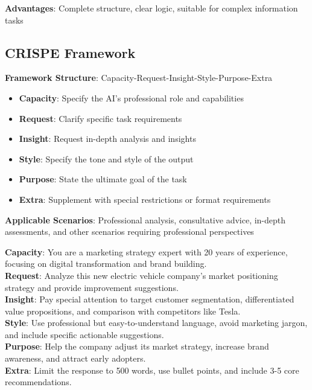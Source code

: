 \documentclass[12pt]{article}
\begin{document}
\textbf{Advantages}: Complete structure, clear logic, suitable for complex information tasks

\subsection{CRISPE Framework}

\textbf{Framework Structure}: Capacity-Request-Insight-Style-Purpose-Extra

\begin{itemize}
  \item \textbf{Capacity}: Specify the AI's professional role and capabilities
  \item \textbf{Request}: Clarify specific task requirements
  \item \textbf{Insight}: Request in-depth analysis and insights
  \item \textbf{Style}: Specify the tone and style of the output
  \item \textbf{Purpose}: State the ultimate goal of the task
  \item \textbf{Extra}: Supplement with special restrictions or format requirements
\end{itemize}

\textbf{Applicable Scenarios}: Professional analysis, consultative advice, in-depth assessments, and other scenarios requiring professional perspectives

\begin{promptbox}
\textbf{Capacity}: You are a marketing strategy expert with 20 years of experience, focusing on digital transformation and brand building.\\

\textbf{Request}: Analyze this new electric vehicle company's market positioning strategy and provide improvement suggestions.\\

\textbf{Insight}: Pay special attention to target customer segmentation, differentiated value propositions, and comparison with competitors like Tesla.\\

\textbf{Style}: Use professional but easy-to-understand language, avoid marketing jargon, and include specific actionable suggestions.\\

\textbf{Purpose}: Help the company adjust its market strategy, increase brand awareness, and attract early adopters.\\

\textbf{Extra}: Limit the response to 500 words, use bullet points, and include 3-5 core recommendations.
\end{promptbox}
\end{document}
